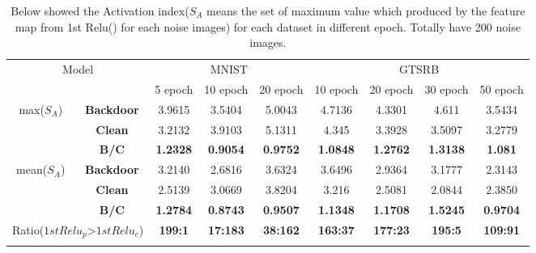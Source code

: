 \documentclass[12pt]{report}
\begin{document}
\begin{table*}[t]
    \centering
    \caption{Below showed the Activation index($S_A$ means the set of maximum value which produced by the feature map from 1st Relu() for each noise images) for each dataset in different epoch. Totally have 200 noise images.}
    \label{table2}
    \begin{tabular}{|c|c|c|c|c|c|c|c|c|}
    \hline
    \multicolumn{2}{|c|}{\multirow{2}{*}{Model}} & \multicolumn{3}{c|}{MNIST}&\multicolumn{4}{c|}{GTSRB}\\
    \cline{3-9}
    
    \multicolumn{2}{|c|}{} & 5 epoch & 10 epoch & 20 epoch & 10 epoch & 20 epoch & 30 epoch & 50 epoch \\
    \hline


    \multirow{3}{*}{max($S_A$)} & \textbf{Backdoor} &3.9615 &3.5404 &5.0043 &4.7136 &4.3301 &4.611 &3.5434 \\
    \cline{2-9}
    
    \multirow{3}{*}{} & \textbf{Clean} &3.2132 &3.9103 &5.1311 &4.345 &3.3928 &3.5097	&3.2779\\
    \cline{2-9}
    
    \multirow{3}{*}{} & \textbf{B/C} &\textbf{1.2328} &\textbf{0.9054} &\textbf{0.9752} &\textbf{1.0848} &\textbf{1.2762}	&\textbf{1.3138}&\textbf{1.081} \\
    \hline

    \multirow{3}{*}{mean($S_A$)} & \textbf{Backdoor} &3.2140 &2.6816 &3.6324 &3.6496 &2.9364 &3.1777 &2.3143 \\
    \cline{2-9}
    
    \multirow{3}{*}{} & \textbf{Clean} &2.5139	&3.0669 &3.8204 &3.216 &2.5081	&2.0844 &2.3850\\
    \cline{2-9}
    
    \multirow{3}{*}{} & \textbf{B/C} &\textbf{1.2784} &\textbf{0.8743} &\textbf{0.9507} &\textbf{1.1348} &\textbf{1.1708}	&\textbf{1.5245} &\textbf{0.9704} \\
    \hline

    \multicolumn{2}{|c|}{Ratio($1stRelu_p$\textgreater $1stRelu_c$)} &\textbf{199:1}    &\textbf{17:183}	&\textbf{38:162}	&\textbf{163:37}	&\textbf{177:23}	&\textbf{195:5}	&\textbf{109:91}\\ 
    
    \hline
    & & & & & & & & \\
    \hline


\end{tabular}
\end{table*}
\end{document}
